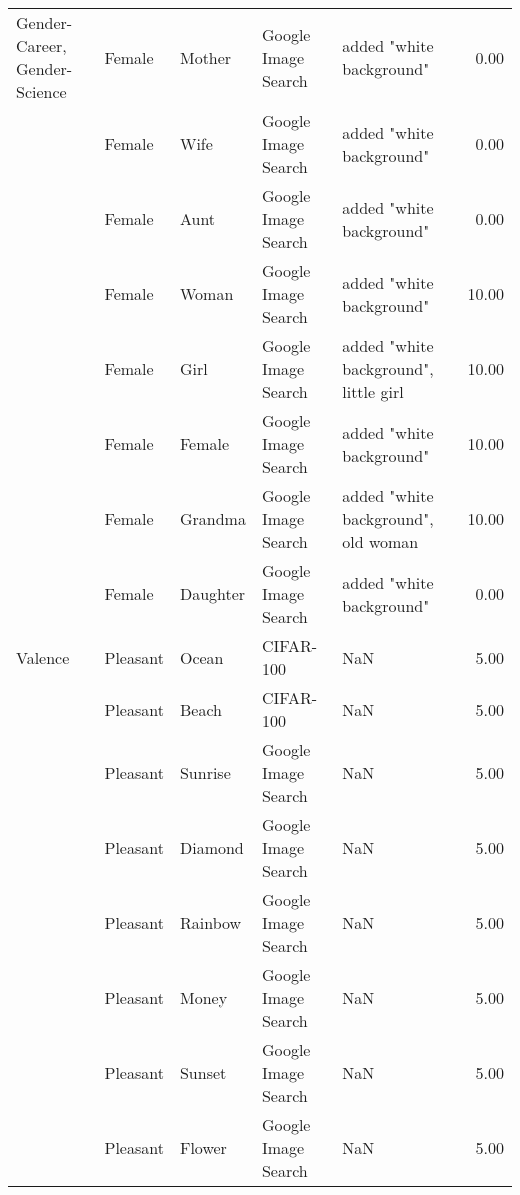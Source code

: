\begin{tabular}{lllllr}
Gender-Career, Gender-Science & Female &             Mother &  Google Image Search &                           added "white background" &  0.00 \\
     & Female &               Wife &  Google Image Search &                           added "white background" &  0.00 \\
     & Female &               Aunt &  Google Image Search &                           added "white background" &  0.00 \\
     & Female &              Woman &  Google Image Search &                           added "white background" & 10.00 \\
     & Female &               Girl &  Google Image Search &              added "white background", little girl & 10.00 \\
     & Female &             Female &  Google Image Search &                           added "white background" & 10.00 \\
     & Female &            Grandma &  Google Image Search &                added "white background", old woman & 10.00 \\
     & Female &           Daughter &  Google Image Search &                           added "white background" &  0.00 \\
Valence & Pleasant &              Ocean &            CIFAR-100 &                                                NaN &  5.00 \\
     & Pleasant &              Beach &            CIFAR-100 &                                                NaN &  5.00 \\
     & Pleasant &            Sunrise &  Google Image Search &                                                NaN &  5.00 \\
     & Pleasant &            Diamond &  Google Image Search &                                                NaN &  5.00 \\
     & Pleasant &            Rainbow &  Google Image Search &                                                NaN &  5.00 \\
     & Pleasant &              Money &  Google Image Search &                                                NaN &  5.00 \\
     & Pleasant &             Sunset &  Google Image Search &                                                NaN &  5.00 \\
     & Pleasant &             Flower &  Google Image Search &                                                NaN &  5.00 \\

\end{tabular}
